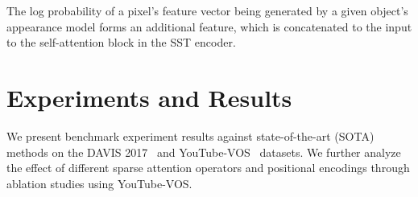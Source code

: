 The log probability of a pixel's feature vector being generated by a given
object's appearance model forms an additional feature, which is concatenated to
the input to the self-attention block in the SST encoder.








\section{Experiments and Results}
\label{sec:experiments}

We present benchmark experiment results against state-of-the-art (SOTA) methods
on the DAVIS 2017~\citep{ponttuset2017davis} and
YouTube-VOS~\citep{xu2018youtubevos} datasets.
We further analyze the effect of different sparse attention operators and
positional encodings through ablation studies using YouTube-VOS\@.


